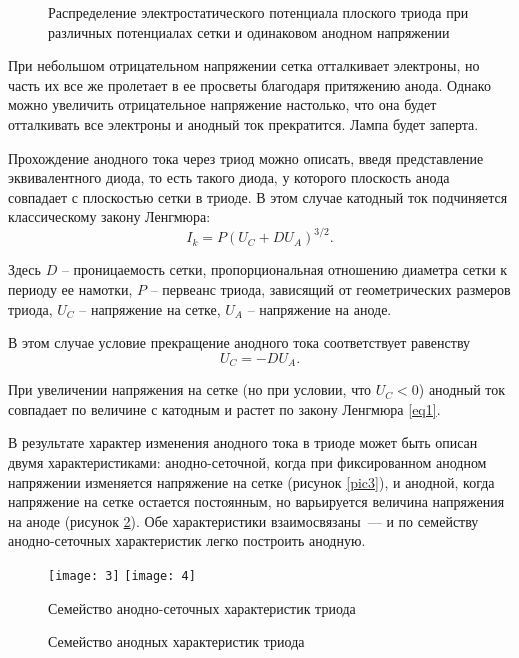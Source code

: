 \begin{figure}[ht]
    \center
    \caption{Распределение электростатического потенциала плоского триода при
    различных потенциалах сетки и одинаковом анодном напряжении}
    \label{pic2}
\end{figure}

При небольшом отрицательном напряжении сетка отталкивает электроны, но часть их
все же пролетает в ее просветы благодаря притяжению анода. Однако можно
увеличить отрицательное напряжение настолько, что она будет отталкивать все
электроны и анодный ток прекратится. Лампа будет заперта.

Прохождение анодного тока через триод можно описать, введя представление
эквивалентного диода, то есть такого диода, у которого плоскость анода
совпадает с плоскостью сетки в триоде. В этом случае катодный ток подчиняется
классическому закону Ленгмюра:
\begin{equation}
    I_k = P(U_C + DU_A)^{3/2}.
    \label{eq1}
\end{equation}

Здесь \( D \) -- проницаемость сетки, пропорциональная отношению диаметра сетки
к периоду ее намотки, \( P \) -- первеанс триода, зависящий от геометрических
размеров триода, \( U_C \) -- напряжение на сетке, \( U_A \) -- напряжение на
аноде.

В этом случае условие прекращение анодного тока соответствует равенству
\begin{equation}
    U_C = -DU_A.
    \label{eq2}
\end{equation}

При увеличении напряжения на сетке (но при условии, что \( U_C < 0 \)) анодный
ток совпадает по величине с катодным и растет по закону Ленгмюра \eqref{eq1}.

В результате характер изменения анодного тока в триоде может быть описан двумя
характеристиками: анодно-сеточной, когда при фиксированном анодном напряжении
изменяется напряжение на сетке (рисунок \ref{pic3}), и анодной, когда
напряжение на сетке остается постоянным, но варьируется величина напряжения на
аноде (рисунок \ref{pic4}). Обе характеристики взаимосвязаны~--- и по семейству
анодно-сеточных характеристик легко построить анодную.

\begin{figure}[ht]
    \center
    \texttt{[image: 3]} \hspace{2em}
    \texttt{[image: 4]}
    \parbox{.45\textwidth}{\caption{Семейство анодно-сеточных характеристик
    триода}\label{pic3}} \hspace{2em}
    \parbox{.45\textwidth}{\caption{Семейство анодных характеристик триода}
    \label{pic4}}
\end{figure}

